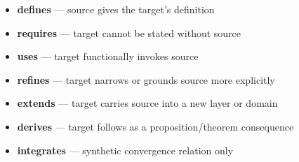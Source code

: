 \documentclass[11pt,a4paper]{article}
\begin{document}
	\begin{itemize}[leftmargin=2em]
		\item \textbf{defines} --- source gives the target's definition
		\item \textbf{requires} --- target cannot be stated without source
		\item \textbf{uses} --- target functionally invokes source
		\item \textbf{refines} --- target narrows or grounds source more explicitly
		\item \textbf{extends} --- target carries source into a new layer or domain
		\item \textbf{derives} --- target follows as a proposition/theorem consequence
		\item \textbf{integrates} --- synthetic convergence relation only
	\end{itemize}
	
\end{document}
